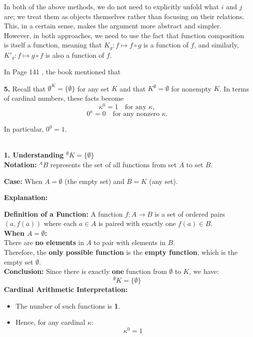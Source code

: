 In both of the above methods, we do not need to explicitly unfold what \(i\) and \(j\) are; we treat them as objects themselves rather than focusing on their relations. This, in a certain sense, makes the argument more abstract and simpler. However, in both approaches, we need to use the fact that function composition is itself a function, meaning that \(K_g: f \mapsto f \circ g\) is a function of \(f\), and similarly, \(K'_g: f \mapsto g \circ f\) is also a function of \(f\).

In Page 141 , the book mentioned that

\begin{leftbar}
    \textbf{5.} Recall that \(\emptyset^K = \{\emptyset\}\) for any set \(K\) and that \(K^{\emptyset} = \emptyset\) for nonempty \(K\). In terms of cardinal numbers, these facts become
    \[
    \kappa^0 = 1 \quad \text{for any } \kappa,
    \]
    \[
    0^{\kappa} = 0 \quad \text{for any nonzero } \kappa.
    \]

    In particular, \(0^0 = 1\).
\end{leftbar}
 \\

\textbf{1. Understanding \({}^\emptyset K = \{\emptyset\}\)} \\ 

\textbf{Notation:} \({}^A B\) represents the set of all functions from set \(A\) to set \(B\).

\textbf{Case:} When \(A = \emptyset\) (the empty set) and \(B = K\) (any set).

\textbf{Explanation:}

\textbf{Definition of a Function:} A function \(f: A \to B\) is a set of ordered pairs \((a, f(a))\) where each \(a \in A\) is paired with exactly one \(f(a) \in B\). \\

\textbf{When \(A = \emptyset\):} \\ 
There are \textbf{no elements} in \(A\) to pair with elements in \(B\). \\ 
Therefore, the \textbf{only possible function} is the \textbf{empty function}, which is the empty set \(\emptyset\). \\
\textbf{Conclusion:} Since there is exactly \textbf{one} function from \(\emptyset\) to \(K\), we have:
  \[
  {}^\emptyset K = \{\emptyset\}
  \]
\textbf{Cardinal Arithmetic Interpretation:}
    \begin{itemize}
        \item The number of such functions is \textbf{1}.
        \item Hence, for any cardinal \(\kappa\):
        \[
        \kappa^0 = 1
        \]
    \end{itemize}

